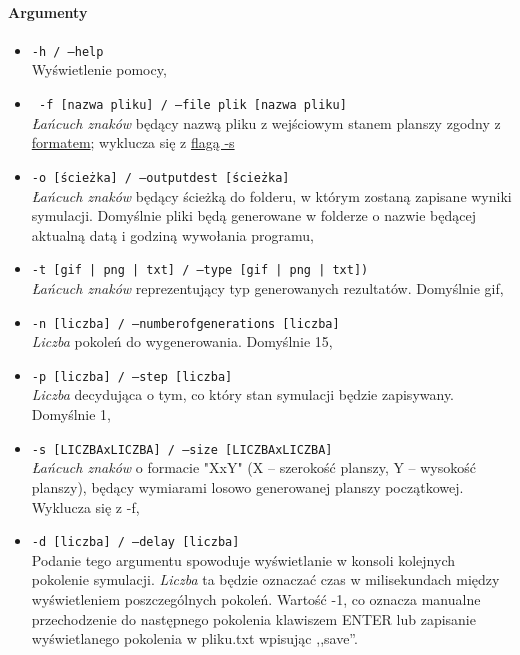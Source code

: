 \documentclass{report}
\begin{document}
\paragraph{Argumenty}
\begin{itemize}
\item \texttt{-h / --help} \\ Wyświetlenie pomocy,
\item \texttt{ -f [nazwa pliku]  / --file plik [nazwa pliku] } 
	\\ \textit{ Łańcuch znaków }będący nazwą pliku z wejściowym stanem planszy zgodny z \hyperref[format]{\textcolor{LinkColor}{formatem}}; wyklucza się z  \hyperref[s]{\textcolor{LinkColor}{flagą -s}}
\item \texttt{-o [ścieżka] / --output\textunderscore{}dest [ścieżka]}  \\\textit{ Łańcuch znaków }będący ścieżką do folderu, w którym zostaną zapisane wyniki \label{output_dest} symulacji. Domyślnie pliki  będą generowane w folderze  o nazwie będącej aktualną datą i godziną wywołania programu,
\item \texttt{-t [gif | png | txt] / --type [gif | png | txt])} \\\textit{ Łańcuch znaków }reprezentujący typ generowanych rezultatów. Domyślnie gif, \label{output_args}
\item \texttt{-n [liczba] / --number\textunderscore{}of\textunderscore{}generations [liczba]} \\ \textit{ Liczba } pokoleń do wygenerowania. Domyślnie 15,
\item \texttt{-p [liczba] / --step [liczba]} \\ \textit{ Liczba }decydująca o tym, co który stan symulacji będzie zapisywany. Domyślnie 1,
\item \label{s} \texttt{-s [LICZBAxLICZBA] / --size [LICZBAxLICZBA]} \\ \textit{ Łańcuch znaków } o formacie "XxY" (X -- szerokość planszy, Y -- wysokość planszy), będący wymiarami losowo generowanej planszy początkowej. Wyklucza się z -f, 
\item \label{delay} \texttt{-d [liczba] / --delay [liczba]} \\ Podanie tego argumentu spowoduje wyświetlanie w konsoli kolejnych pokolenie symulacji. \textit{ Liczba } ta będzie oznaczać czas  w milisekundach między wyświetleniem poszczególnych pokoleń. Wartość -1, co oznacza manualne przechodzenie do następnego pokolenia klawiszem ENTER lub zapisanie wyświetlanego pokolenia w pliku.txt wpisując ,,save''.
\end{itemize}
\end{document}
